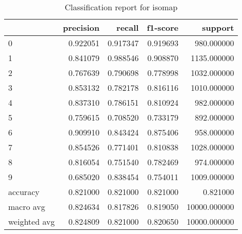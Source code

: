 \begin{table}[htb!]
    \centering
    \caption{Classification report for isomap}
    \label{tab:classification-report-isomap}
    \begin{tabular}{lrrrr}
        \toprule
                     & precision & recall   & f1-score & support      \\
        \midrule
        0            & 0.922051  & 0.917347 & 0.919693 & 980.000000   \\
        1            & 0.841079  & 0.988546 & 0.908870 & 1135.000000  \\
        2            & 0.767639  & 0.790698 & 0.778998 & 1032.000000  \\
        3            & 0.853132  & 0.782178 & 0.816116 & 1010.000000  \\
        4            & 0.837310  & 0.786151 & 0.810924 & 982.000000   \\
        5            & 0.759615  & 0.708520 & 0.733179 & 892.000000   \\
        6            & 0.909910  & 0.843424 & 0.875406 & 958.000000   \\
        7            & 0.854526  & 0.771401 & 0.810838 & 1028.000000  \\
        8            & 0.816054  & 0.751540 & 0.782469 & 974.000000   \\
        9            & 0.685020  & 0.838454 & 0.754011 & 1009.000000  \\
        accuracy     & 0.821000  & 0.821000 & 0.821000 & 0.821000     \\
        macro avg    & 0.824634  & 0.817826 & 0.819050 & 10000.000000 \\
        weighted avg & 0.824809  & 0.821000 & 0.820650 & 10000.000000 \\
        \bottomrule
    \end{tabular}
\end{table}
